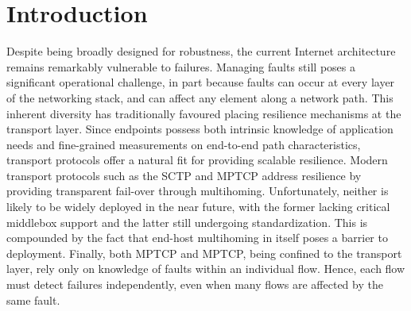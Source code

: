 \section{Introduction}

Despite being broadly designed for robustness, the current Internet architecture remains remarkably vulnerable to failures.
Managing faults still poses a significant operational challenge, in part because faults can occur at every layer of the networking stack, and can affect any element along a network path. 
This inherent diversity has traditionally favoured placing resilience mechanisms at the transport layer. 
Since endpoints possess both intrinsic knowledge of application needs and fine-grained measurements on end-to-end path characteristics, transport protocols offer a natural fit for providing scalable resilience.
Modern transport protocols such as the \ac{SCTP} \cite{rfc4960} and \ac{MPTCP} \cite{Wischik:2008p137} address resilience by providing transparent fail-over through multihoming.
Unfortunately, neither is likely to be widely deployed in the near future, with the former lacking critical middlebox support and the latter still undergoing standardization. 
This is compounded by the fact that end-host multihoming in itself poses a barrier to deployment.
Finally, both \ac{MPTCP} and \ac{MPTCP}, being confined to the transport layer, rely only on knowledge of faults within an individual flow. Hence, each flow must detect failures independently, even when many flows are affected by the same fault.

